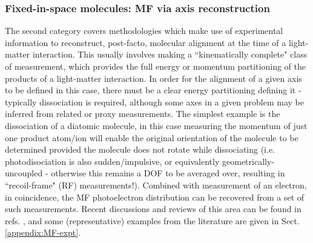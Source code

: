 


\subsubsection{Fixed-in-space molecules: MF via axis reconstruction\label{sec:fixed-in-space}}

The second category covers methodologies which make use of experimental information to reconstruct, post-facto, molecular alignment at the time of a light-matter interaction. This usually involves making a ``kinematically complete" class of measurement, which provides the full energy or momentum partitioning of the products of a light-matter interaction. In order for the alignment of a given axis to be defined in this case, there must be a clear energy partitioning defining it - typically dissociation is required, although some axes in a given problem may be inferred from related or proxy measurements. The simplest example is the dissociation of a diatomic molecule, in this case measuring the momentum of just one product atom/ion will enable the original orientation of the molecule to be determined 
provided the molecule does not rotate while dissociating (i.e. photodisociation is also sudden/impulsive, or equivalently geometrically-uncoupled - otherwise this remains a DOF to be averaged over, resulting in ``recoil-frame" (RF) measurements!). Combined with measurement of an electron, in coincidence, the MF photoelectron distribution can be recovered from a set of such measurements. Recent discussions and reviews of this area can be found in refs. \cite{Yagishita2005,Reid2012,dowek2012PhotoionizationDynamicsPhotoemission,Yagishita2015,jahnke2022PhotoelectronDiffraction}, and some (representative) examples from the literature are given in Sect. \ref{appendix:MF-expt}.


